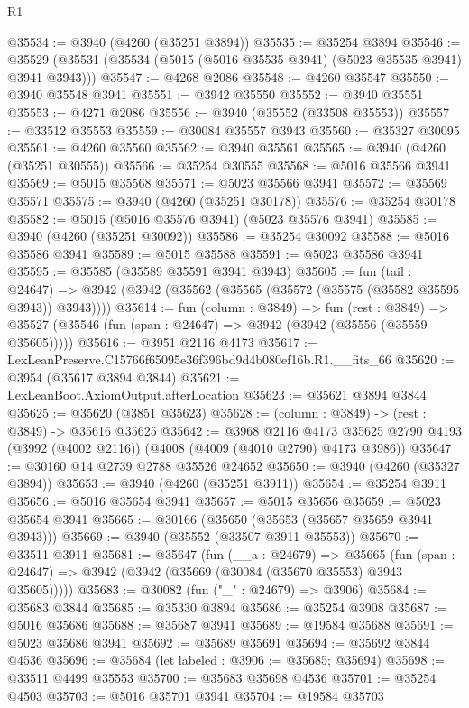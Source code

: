 \begin{lexlean}{R1}
\begin{coremodule}
@35534 := @3940 (@4260 (@35251 @3894))
@35535 := @35254 @3894
@35546 := @35529 (@35531 (@35534 (@5015 (@5016 @35535 @3941) (@5023 @35535 @3941) @3941 @3943)))
@35547 := @4268 @2086
@35548 := @4260 @35547
@35550 := @3940 @35548 @3941
@35551 := @3942 @35550
@35552 := @3940 @35551
@35553 := @4271 @2086
@35556 := @3940 (@35552 (@33508 @35553))
@35557 := @33512 @35553
@35559 := @30084 @35557 @3943
@35560 := @35327 @30095
@35561 := @4260 @35560
@35562 := @3940 @35561
@35565 := @3940 (@4260 (@35251 @30555))
@35566 := @35254 @30555
@35568 := @5016 @35566 @3941
@35569 := @5015 @35568
@35571 := @5023 @35566 @3941
@35572 := @35569 @35571
@35575 := @3940 (@4260 (@35251 @30178))
@35576 := @35254 @30178
@35582 := @5015 (@5016 @35576 @3941) (@5023 @35576 @3941)
@35585 := @3940 (@4260 (@35251 @30092))
@35586 := @35254 @30092
@35588 := @5016 @35586 @3941
@35589 := @5015 @35588
@35591 := @5023 @35586 @3941
@35595 := @35585 (@35589 @35591 @3941 @3943)
@35605 := fun (tail : @24647) =>
  @3942 (@3942 (@35562 (@35565 (@35572 (@35575 (@35582 @35595 @3943)) @3943))))
@35614 := fun (column : @3849) =>
  fun (rest : @3849) =>
  @35527 (@35546 (fun (span : @24647) => @3942 (@3942 (@35556 (@35559 @35605)))))
@35616 := @3951 @2116 @4173
@35617 := LexLeanPreserve.C15766f65095e36f396bd9d4b080ef16b.R1.__fits_66
@35620 := @3954 (@35617 @3894 @3844)
@35621 := LexLeanBoot.AxiomOutput.afterLocation
@35623 := @35621 @3894 @3844
@35625 := @35620 (@3851 @35623)
@35628 := (column : @3849) -> (rest : @3849) -> @35616 @35625
@35642 := @3968
    @2116
    @4173
    @35625
    @2790
    @4193
    (@3992 (@4002 @2116))
    (@4008 (@4009 (@4010 @2790) @4173 @3986))
@35647 := @30160 @14 @2739 @2788 @35526 @24652
@35650 := @3940 (@4260 (@35327 @3894))
@35653 := @3940 (@4260 (@35251 @3911))
@35654 := @35254 @3911
@35656 := @5016 @35654 @3941
@35657 := @5015 @35656
@35659 := @5023 @35654 @3941
@35665 := @30166 (@35650 (@35653 (@35657 @35659 @3941 @3943)))
@35669 := @3940 (@35552 (@33507 @3911 @35553))
@35670 := @33511 @3911
@35681 := @35647
    (fun (__a : @24679) =>
    @35665 (fun (span : @24647) => @3942 (@3942 (@35669 (@30084 (@35670 @35553) @3943 @35605)))))
@35683 := @30082 (fun ("_" : @24679) => @3906)
@35684 := @35683 @3844
@35685 := @35330 @3894
@35686 := @35254 @3908
@35687 := @5016 @35686
@35688 := @35687 @3941
@35689 := @19584 @35688
@35691 := @5023 @35686 @3941
@35692 := @35689 @35691
@35694 := @35692 @3844 @4536
@35696 := @35684 (let labeled : @3906 := @35685; @35694)
@35698 := @33511 @4499 @35553
@35700 := @35683 @35698 @4536
@35701 := @35254 @4503
@35703 := @5016 @35701 @3941
@35704 := @19584 @35703

\end{coremodule}
\end{lexlean}
